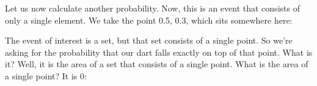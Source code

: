 \documentclass[pdftex, brazil, 12pt, twoside]{article}
\begin{document}
\begin{figure}[H]
  \begin{center}
  \end{center}
\end{figure}

Let us now calculate another probability.
Now, this is an event that consists of
only a single element.
We take the point 0.5, 0.3, which sits somewhere here:

\begin{figure}[H]
  \begin{center}
  \end{center}
\end{figure}

The event of interest is a set, but that set consists of
a single point.
So we're asking for the probability that our dart
falls exactly on top of that point.
What is it?
Well, it is the area of a set that
consists of a single point.
What is the area of a single point?
It is 0:

\begin{figure}[H]
  \begin{center}
  \end{center}
\end{figure}
\end{document}
